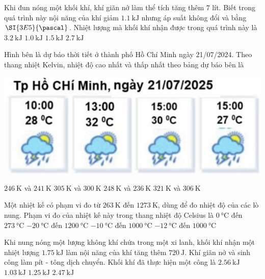 \begin{ex}
	Khi đun nóng một khối khí, khí giãn nở làm thể tích tăng thêm 7 lít. Biết trong quá trình này nội năng của khí giảm $\SI{1.1}{\kilo\joule}$ nhưng áp suất không đổi và bằng $\SI{3E5}{\pascal}$. Nhiệt lượng mà khối khí nhận được trong quá trình này là
	\choice
	{$\SI{3.2}{\kilo\joule}$}
	{\True $\SI{1.0}{\kilo\joule}$}
	{$\SI{1.5}{\kilo\joule}$}
	{$\SI{2.7}{\kilo\joule}$}
\end{ex}
\begin{ex}
	Hình bên là dự báo thời tiết ở thành phố Hồ Chí Minh ngày 21/07/2024. Theo thang nhiệt Kelvin, nhiệt độ cao nhất và thấp nhất theo bảng dự báo bên là
	\begin{center}
		\includegraphics[width=0.3\linewidth]{../figs/D12-1-2}
	\end{center}
	\choice
	{$\SI{246}{\kelvin}$ và $\SI{241}{\kelvin}$}
	{\True $\SI{305}{\kelvin}$ và $\SI{300}{\kelvin}$}
	{$\SI{248}{\kelvin}$ và $\SI{236}{\kelvin}$}
	{$\SI{321}{\kelvin}$ và $\SI{306}{\kelvin}$}
	\loigiai{}
\end{ex}
\begin{ex}
	Một nhiệt kế có phạm vi đo từ $\SI{263}{\kelvin}$ đến $\SI{1273}{\kelvin}$, dùng để đo nhiệt độ của các lò nung. Phạm vi đo của nhiệt kế này trong thang nhiệt độ Celsius là
	\choice
	{$\SI{0}{\celsius}$ đến $\SI{273}{\celsius}$}
	{$\SI{-20}{\celsius}$ đến $\SI{1200}{\celsius}$}
	{\True $\SI{-10}{\celsius}$ đến $\SI{1000}{\celsius}$}
	{$\SI{-12}{\celsius}$ đến $\SI{1000}{\celsius}$}
	\loigiai{}
\end{ex}
\begin{ex}
	Khi nung nóng một lượng không khí chứa trong một xi lanh, khối khí nhận một nhiệt lượng $\SI{1.75}{\kilo\joule}$ làm nội năng của khí tăng thêm $\SI{720}{\joule}$. Khí giãn nở và sinh công làm pít - tông dịch chuyển. Khối khí đã thực hiện một công là	
	\choice
	{$\SI{2.56}{\kilo\joule}$}
	{\True $\SI{1.03}{\kilo\joule}$}
	{$\SI{1.25}{\kilo\joule}$}
	{$\SI{2.47}{\kilo\joule}$}
\end{ex}
